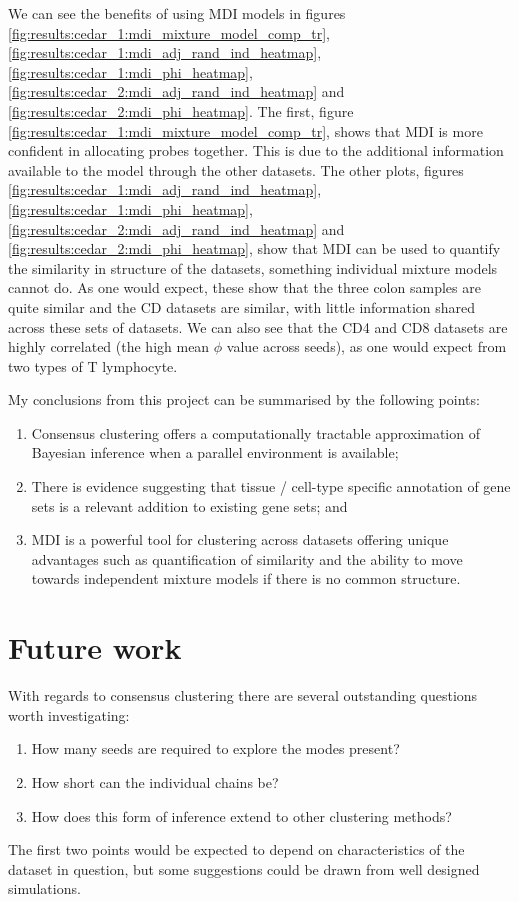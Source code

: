 \documentclass[12pt]{article} %
\begin{document}
	We can see the benefits of using MDI models in figures \ref{fig:results:cedar_1:mdi_mixture_model_comp_tr}, \ref{fig:results:cedar_1:mdi_adj_rand_ind_heatmap}, \ref{fig:results:cedar_1:mdi_phi_heatmap}, \ref{fig:results:cedar_2:mdi_adj_rand_ind_heatmap} and \ref{fig:results:cedar_2:mdi_phi_heatmap}. The first, figure \ref{fig:results:cedar_1:mdi_mixture_model_comp_tr}, shows that MDI is more confident in allocating probes together. This is due to the additional information available to the model through the other datasets. The other plots, figures \ref{fig:results:cedar_1:mdi_adj_rand_ind_heatmap}, \ref{fig:results:cedar_1:mdi_phi_heatmap}, \ref{fig:results:cedar_2:mdi_adj_rand_ind_heatmap} and \ref{fig:results:cedar_2:mdi_phi_heatmap}, show that MDI can be used to quantify the similarity in structure of the datasets, something individual mixture models cannot do. As one would expect, these show that the three colon samples are quite similar and the CD datasets are similar, with little information shared across these sets of datasets. We can also see that the CD4 and CD8 datasets are highly correlated (the high mean $\phi$ value across seeds), as one would expect from two types of T lymphocyte.
	
	My conclusions from this project can be summarised by the following points:
	\begin{enumerate}
		\item Consensus clustering offers a computationally tractable approximation of Bayesian inference when a parallel environment is available; 
		\item There is evidence suggesting that tissue / cell-type specific annotation of gene sets is a relevant addition to existing gene sets; and
		\item MDI is a powerful tool for clustering across datasets offering unique advantages such as quantification of similarity and the ability to move towards independent mixture models if there is no common structure.
	\end{enumerate} 
	
	\section{Future work}
	With regards to consensus clustering there are several outstanding questions worth investigating:
	\begin{enumerate}
		\item How many seeds are required to explore the modes present?
		\item How short can the individual chains be?
		\item How does this form of inference extend to other clustering methods?
	\end{enumerate}
	The first two points would be expected to depend on characteristics of the dataset in question, but some suggestions could be drawn from well designed simulations.
	
\end{document}
